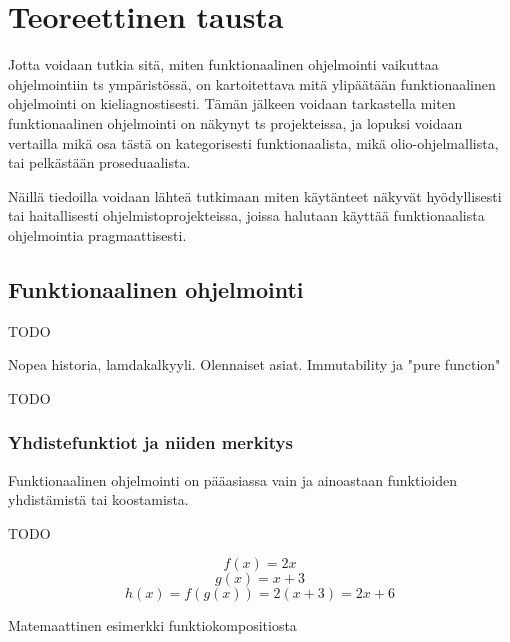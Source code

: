 \vspace{21.5pt}
\chapter{Teoreettinen tausta}

Jotta voidaan tutkia sitä, miten funktionaalinen ohjelmointi vaikuttaa ohjelmointiin \gls{ts} ympäristössä, on kartoitettava mitä ylipäätään funktionaalinen ohjelmointi on kieliagnostisesti. Tämän jälkeen voidaan tarkastella miten funktionaalinen ohjelmointi on näkynyt \gls{ts} projekteissa, ja lopuksi voidaan vertailla mikä osa tästä on kategorisesti funktionaalista, mikä olio-ohjelmallista, tai pelkästään proseduaalista.

Näillä tiedoilla voidaan lähteä tutkimaan miten käytänteet näkyvät hyödyllisesti tai haitallisesti ohjelmistoprojekteissa, joissa halutaan käyttää funktionaalista ohjelmointia pragmaattisesti.

\section{Funktionaalinen ohjelmointi}

TODO

Nopea historia, lamdakalkyyli. Olennaiset asiat. Immutability ja "pure function"

TODO

\subsection{Yhdistefunktiot ja niiden merkitys}

Funktionaalinen ohjelmointi on pääasiassa vain ja ainoastaan funktioiden yhdistämistä tai koostamista.

TODO

\begin{code}
  \begin{equation}
    f(x) = 2x
  \end{equation}
  \begin{equation}
    g(x) = x + 3
  \end{equation}
  \begin{equation}
    h(x) = f(g(x)) = 2(x + 3) = 2x + 6
  \end{equation}
  \caption{Matemaattinen esimerkki funktiokompositiosta}
  \label{equation:composition}
\end{code}
\bigskip

